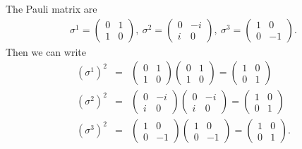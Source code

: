\documentclass[11pt]{article}
\begin{document}
\section{ }
The Pauli matrix are
\begin{eqnarray}
  \sigma^1=
  \begin{pmatrix}
    0&1\\1&0
  \end{pmatrix},~
  \sigma^2=
  \begin{pmatrix}
    0&-i \\i&0
  \end{pmatrix},~
  \sigma^3=
  \begin{pmatrix}
    1&0\\0&-1
  \end{pmatrix}.
\end{eqnarray}
Then we can write
\begin{eqnarray}
  (\sigma^1)^2&=&
  \begin{pmatrix}
    0&1\\1&0
  \end{pmatrix}
  \begin{pmatrix}
    0&1\\1&0
  \end{pmatrix}=
  \begin{pmatrix}
    1&0\\0&1
  \end{pmatrix} \nonumber \\
  (\sigma^2)^2&=&
  \begin{pmatrix}
    0&-i \\i&0
  \end{pmatrix}
  \begin{pmatrix}
    0&-i \\i&0
  \end{pmatrix}
  =\begin{pmatrix}
    1&0\\0&1
  \end{pmatrix} \nonumber \\
  (\sigma^3)^2&=&
  \begin{pmatrix}
    1&0\\0&-1
  \end{pmatrix}
  \begin{pmatrix}
    1&0\\0&-1
  \end{pmatrix}
  =\begin{pmatrix}
    1&0\\0&1
  \end{pmatrix}.
\end{eqnarray}
    
\end{document}
